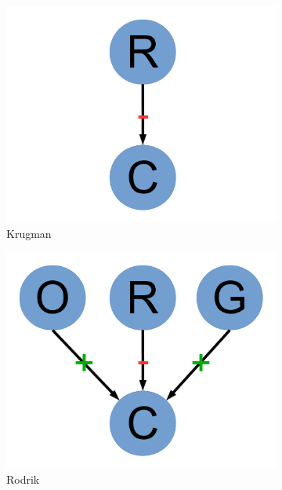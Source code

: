 \documentclass[11pt]{article}
\begin{document}
\begin{figure}
\begin{subfigure}[b]{0.2\textwidth}
                \includegraphics[width=\textwidth]{krugman.pdf}
                \caption{\footnotesize Krugman}
                \label{fig:krugman}
        \end{subfigure}
        \begin{subfigure}[b]{0.2\textwidth}
                \includegraphics[width=\textwidth]{rodrik.pdf}
                \caption{\footnotesize Rodrik}
                \label{fig:rodrik}
        \end{subfigure}
        \begin{subfigure}[b]{0.2\textwidth}

\end{subfigure}
\end{figure}
\end{document}
